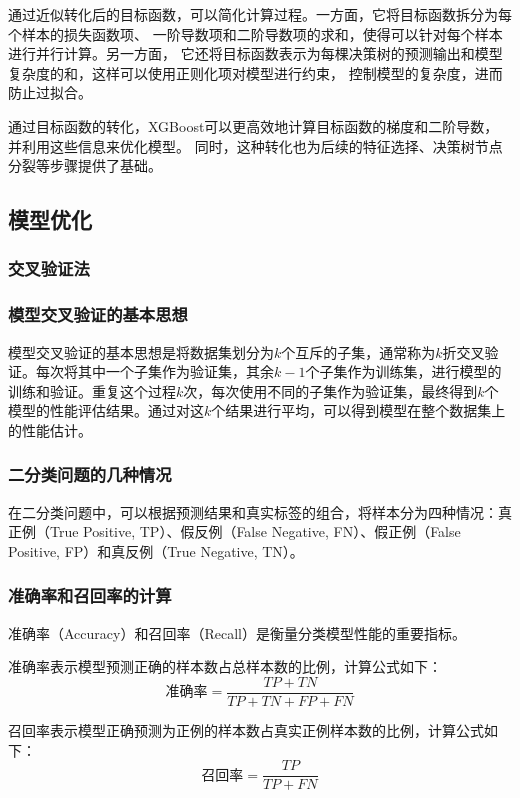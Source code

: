 \documentclass{article}
\begin{document}
通过近似转化后的目标函数，可以简化计算过程。一方面，它将目标函数拆分为每个样本的损失函数项、
一阶导数项和二阶导数项的求和，使得可以针对每个样本进行并行计算。另一方面，
它还将目标函数表示为每棵决策树的预测输出和模型复杂度的和，这样可以使用正则化项对模型进行约束，
控制模型的复杂度，进而防止过拟合。\cite{reference8}

通过目标函数的转化，XGBoost可以更高效地计算目标函数的梯度和二阶导数，并利用这些信息来优化模型。
同时，这种转化也为后续的特征选择、决策树节点分裂等步骤提供了基础。

\subsection{模型优化}

\subsubsection{交叉验证法}

\subsubsection*{模型交叉验证的基本思想}
模型交叉验证的基本思想是将数据集划分为$k$个互斥的子集，通常称为$k$折交叉验证。每次将其中一个子集作为验证集，其余$k-1$个子集作为训练集，进行模型的训练和验证。重复这个过程$k$次，每次使用不同的子集作为验证集，最终得到$k$个模型的性能评估结果。通过对这$k$个结果进行平均，可以得到模型在整个数据集上的性能估计。

\subsubsection*{二分类问题的几种情况}
在二分类问题中，可以根据预测结果和真实标签的组合，将样本分为四种情况：真正例（True Positive, TP）、假反例（False Negative, FN）、假正例（False Positive, FP）和真反例（True Negative, TN）。

\subsubsection*{准确率和召回率的计算}
准确率（Accuracy）和召回率（Recall）是衡量分类模型性能的重要指标。

准确率表示模型预测正确的样本数占总样本数的比例，计算公式如下：
\[
\text{准确率} = \frac{{TP + TN}}{{TP + TN + FP + FN}}
\]

召回率表示模型正确预测为正例的样本数占真实正例样本数的比例，计算公式如下：
\[
\text{召回率} = \frac{{TP}}{{TP + FN}}
\]
\end{document}

